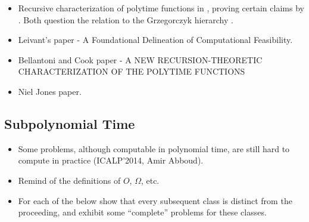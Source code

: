 \begin{itemize}

\item Recursive characterization of polytime functions in \cite{rose-1984},
proving certain claims by \cite{cobham-1965}. Both question the relation to the
Grzegorczyk hierarchy \cite{grzegorczyk-1953}.

\item Leivant's paper - A Foundational Delineation of Computational Feasibility.

\item Bellantoni and Cook paper - A NEW RECURSION-THEORETIC CHARACTERIZATION OF
THE POLYTIME FUNCTIONS

\item Niel Jones paper.

\end{itemize}

\subsection{Subpolynomial Time}

\begin{itemize}

\item Some problems, although computable in polynomial time, are still hard to
compute in practice (ICALP'2014, Amir Abboud).

\item Remind of the definitions of $O$, $\Omega$, etc.

\item For each of the below show that every subsequent class is distinct from
the proceeding, and exhibit some ``complete'' problems for these classes.

\end{itemize}

